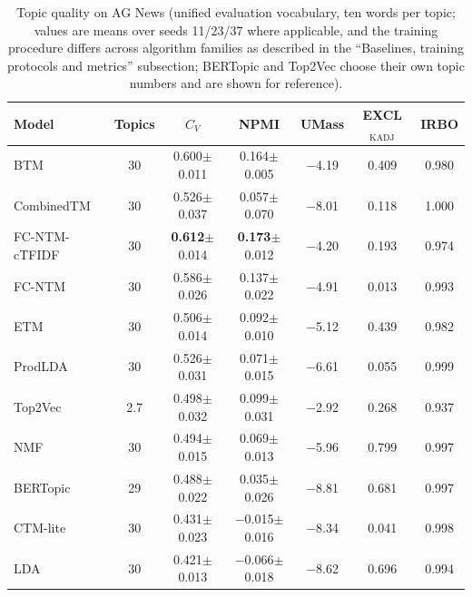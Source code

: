 \documentclass[Journal,letterpaper]{ascelike-new}
\newcommand{\fcntm}{FC-NTM}
\begin{document}
\begin{table}[t]
\centering
\caption{Topic quality on AG News (unified evaluation vocabulary, ten words per topic; values are means over seeds 11/23/37 where applicable, and the training procedure differs across algorithm families as described in the ``Baselines, training protocols and metrics'' subsection; BERTopic and Top2Vec choose their own topic numbers and are shown for reference).}
\label{tab:agnews}
\small
\begin{tabular}{lcccccc}
\toprule
Model & Topics & $C_V$ & NPMI & UMass & EXCL$_{\mathrm{KADJ}}$ & IRBO \\
\midrule
BTM & 30 & 0.600$\pm$0.011 & 0.164$\pm$0.005 & $-$4.19 & 0.409 & 0.980 \\
CombinedTM & 30 & 0.526$\pm$0.037 & 0.057$\pm$0.070 & $-$8.01 & 0.118 & 1.000 \\
\fcntm{}-cTFIDF & 30 & \textbf{0.612}$\pm$0.014 & \textbf{0.173}$\pm$0.012 & $-$4.20 & 0.193 & 0.974 \\
\fcntm{} & 30 & 0.586$\pm$0.026 & 0.137$\pm$0.022 & $-$4.91 & 0.013 & 0.993 \\
ETM & 30 & 0.506$\pm$0.014 & 0.092$\pm$0.010 & $-$5.12 & 0.439 & 0.982 \\
ProdLDA & 30 & 0.526$\pm$0.031 & 0.071$\pm$0.015 & $-$6.61 & 0.055 & 0.999 \\
Top2Vec & 2.7 & 0.498$\pm$0.032 & 0.099$\pm$0.031 & $-$2.92 & 0.268 & 0.937 \\
NMF & 30 & 0.494$\pm$0.015 & 0.069$\pm$0.013 & $-$5.96 & 0.799 & 0.997 \\
BERTopic & 29 & 0.488$\pm$0.022 & 0.035$\pm$0.026 & $-$8.81 & 0.681 & 0.997 \\
CTM-lite & 30 & 0.431$\pm$0.023 & $-$0.015$\pm$0.016 & $-$8.34 & 0.041 & 0.998 \\
LDA & 30 & 0.421$\pm$0.013 & $-$0.066$\pm$0.018 & $-$8.62 & 0.696 & 0.994 \\
\bottomrule
\end{tabular}
\end{table}
\end{document}
